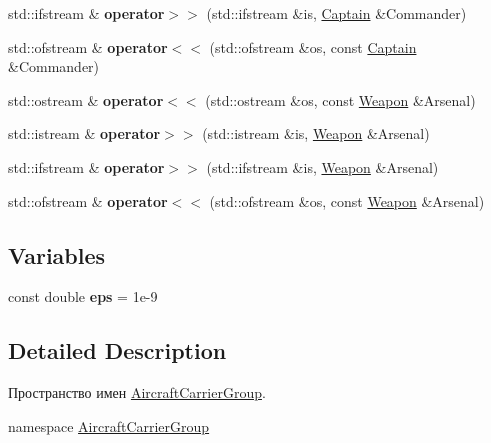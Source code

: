 \begin{DoxyCompactItemize}
$$std\+::ifstream \& {\bfseries operator$>$$>$} (std\+::ifstream \&is, \mbox{\hyperlink{struct_aircraft_carrier_group_1_1_captain}{Captain}} \&Commander)
\item 
\mbox{\label{namespace_aircraft_carrier_group_abe06f32467ae0067f2c206f5033492c9}} 
std\+::ofstream \& {\bfseries operator$<$$<$} (std\+::ofstream \&os, const \mbox{\hyperlink{struct_aircraft_carrier_group_1_1_captain}{Captain}} \&Commander)
\item 
\mbox{\label{namespace_aircraft_carrier_group_a95ec58ec6070dd4cec3008ef366f0573}} 
std\+::ostream \& {\bfseries operator$<$$<$} (std\+::ostream \&os, const \mbox{\hyperlink{class_aircraft_carrier_group_1_1_weapon}{Weapon}} \&Arsenal)
\item 
\mbox{\label{namespace_aircraft_carrier_group_a22724b26d62acbbb6a2e11e25396f182}} 
std\+::istream \& {\bfseries operator$>$$>$} (std\+::istream \&is, \mbox{\hyperlink{class_aircraft_carrier_group_1_1_weapon}{Weapon}} \&Arsenal)
\item 
\mbox{\label{namespace_aircraft_carrier_group_afbb32142a113b66b4ca1e1b349a34cee}} 
std\+::ifstream \& {\bfseries operator$>$$>$} (std\+::ifstream \&is, \mbox{\hyperlink{class_aircraft_carrier_group_1_1_weapon}{Weapon}} \&Arsenal)
\item 
\mbox{\label{namespace_aircraft_carrier_group_a43a8c4b863d42762174e25ec9469121f}} 
std\+::ofstream \& {\bfseries operator$<$$<$} (std\+::ofstream \&os, const \mbox{\hyperlink{class_aircraft_carrier_group_1_1_weapon}{Weapon}} \&Arsenal)
\end{DoxyCompactItemize}
\subsection*{Variables}
\begin{DoxyCompactItemize}
\item 
\mbox{\label{namespace_aircraft_carrier_group_a450635cd66c0fbcc37535160a56142b8}} 
const double {\bfseries eps} = 1e-\/9
\end{DoxyCompactItemize}


\subsection{Detailed Description}
Пространство имен \mbox{\hyperlink{namespace_aircraft_carrier_group}{Aircraft\+Carrier\+Group}}. 

namespace \mbox{\hyperlink{namespace_aircraft_carrier_group}{Aircraft\+Carrier\+Group}} 